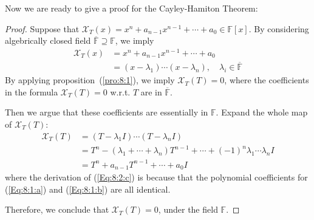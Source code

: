 Now we are ready to give a proof for the Cayley-Hamiton Theorem:
\begin{proof}
Suppose that $\mathcal{X}_T(x)=x^n+a_{n-1}x^{n-1}+\cdots+a_0\in\mathbb{F}[x]$. By considering algebrically closed field $\overline{\mathbb{F}}\supseteq\mathbb{F}$, we imply
\begin{subequations}
\begin{align}
\mathcal{X}_T(x)&=x^n+a_{n-1}x^{n-1}+\cdots+a_0\label{Eq:8:1:a}\\
&=(x-\lambda_1)\cdots(x-\lambda_n),
\quad
\lambda_i\in\overline{\mathbb{F}}\label{Eq:8:1:b}
\end{align}
\end{subequations}
By applying proposition~(\ref{pro:8:1}), we imply $\mathcal{X}_T(T)=0$, where the coefficients in the formula $\mathcal{X}_T(T)=0$ w.r.t. $T$ are in $\overline{\mathbb{F}}$.

Then we argue that these coefficients are essentially in $\mathbb{F}$. Expand the whole map of $\mathcal{X}_T(T)$:
\begin{subequations}
\begin{align}
\mathcal{X}_T(T)
&=
(T-\lambda_1I)\cdots(T-\lambda_nI)
\\&=
T^n-(\lambda_1+\cdots+\lambda_n)T^{n-1}+\cdots+(-1)^n\lambda_1\cdots\lambda_nI\\
&=
T^n+a_{n-1}T^{n-1}+\cdots+a_0I\label{Eq:8:2:c}
\end{align}
\end{subequations}
where the derivation of (\ref{Eq:8:2:c}) is because that the polynomial coefficients for (\ref{Eq:8:1:a}) and (\ref{Eq:8:1:b}) are all identical.

Therefore, we conclude that $\mathcal{X}_T(T)=0$, under the field $\mathbb{F}$.
\end{proof}

